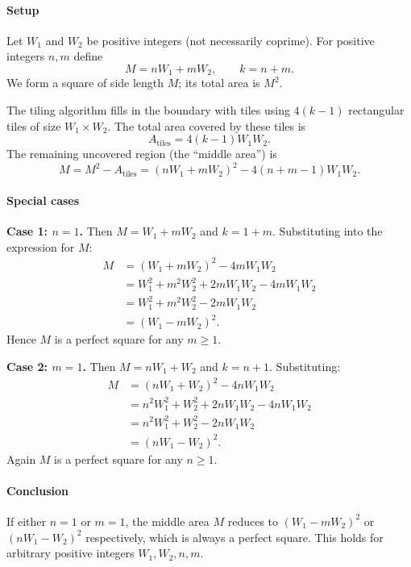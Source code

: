 
\paragraph{Setup}
Let \(W_1\) and \(W_2\) be positive integers (not necessarily coprime).  
For positive integers \(n, m\) define
\[
M = nW_1 + mW_2 ,\qquad k = n + m .
\]
We form a square of side length \(M\); its total area is \(M^2\).  

The tiling algorithm fills in the boundary with tiles using \(4(k-1)\) rectangular tiles of size \(W_1 \times W_2\).  
The total area covered by these tiles is 
\[
A_{\text{tiles}} = 4(k-1) W_1 W_2 .
\]
The remaining uncovered region (the ``middle area'') is
\[
M = M^2 - A_{\text{tiles}}
    = (nW_1 + mW_2)^2 - 4(n+m-1)W_1W_2 .
\]

\paragraph{Special cases}
\noindent\textbf{Case 1: \(n = 1\).}  
Then \(M = W_1 + mW_2\) and \(k = 1 + m\).  Substituting into the expression for \(M\):
\begin{align*}
M &= (W_1 + mW_2)^2 - 4m W_1W_2 \\
  &= W_1^2 + m^2W_2^2 + 2mW_1W_2 - 4mW_1W_2 \\
  &= W_1^2 + m^2W_2^2 - 2mW_1W_2 \\
  &= (W_1 - mW_2)^2 .
\end{align*}
Hence \(M\) is a perfect square for any \(m \ge 1\).

\noindent\textbf{Case 2: \(m = 1\).}  
Then \(M = nW_1 + W_2\) and \(k = n + 1\).  Substituting:
\begin{align*}
M &= (nW_1 + W_2)^2 - 4n W_1W_2 \\
  &= n^2W_1^2 + W_2^2 + 2nW_1W_2 - 4nW_1W_2 \\
  &= n^2W_1^2 + W_2^2 - 2nW_1W_2 \\
  &= (nW_1 - W_2)^2 .
\end{align*}
Again \(M\) is a perfect square for any \(n \ge 1\).

\paragraph{Conclusion}
If either \(n = 1\) or \(m = 1\), the middle area \(M\) reduces to \((W_1 - mW_2)^2\) or \((nW_1 - W_2)^2\) respectively, which is always a perfect square.  
This holds for arbitrary positive integers \(W_1, W_2, n, m\).